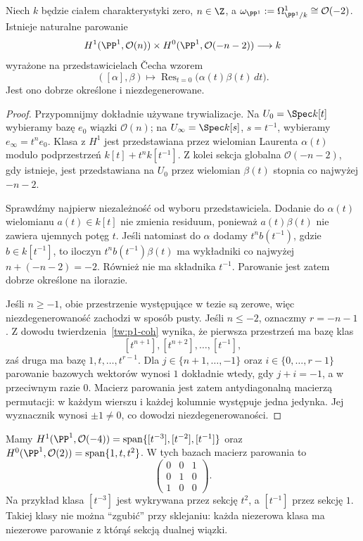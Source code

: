 \begin{twierdzenie}
\label{tw:serre-p1-explicit}
Niech $k$ będzie ciałem charakterystyki zero,
$n\in\Z$, a $\omega_{\PP^1}:=\Omega^1_{\PP^1/k}
\cong\mathcal O(-2)$. Istnieje naturalne parowanie
\[
 H^1(\PP^1,\mathcal O(n))\times
 H^0(\PP^1,\mathcal O(-n-2))\longrightarrow k
\]
wyrażone na przedstawicielach Čecha wzorem
\[
 ([\alpha],\beta)\longmapsto
 \operatorname{Res}_{t=0}\bigl(\alpha(t)\beta(t)\,dt\bigr).
\]
Jest ono dobrze określone i niezdegenerowane.
\end{twierdzenie}
\begin{proof}
Przypomnijmy dokładnie używane trywializacje.
Na $U_0=\Spec k[t]$ wybieramy bazę $e_0$ wiązki
$\mathcal O(n)$; na $U_\infty=\Spec k[s]$, $s=t^{-1}$,
wybieramy $e_\infty=t^n e_0$. Klasa z $H^1$ jest
przedstawiana przez wielomian Laurenta $\alpha(t)$ modulo
podprzestrzeń $k[t]+t^n k[t^{-1}]$.
Z kolei sekcja globalna $\mathcal O(-n-2)$,
gdy istnieje, jest przedstawiana na $U_0$ przez
wielomian $\beta(t)$ stopnia co najwyżej $-n-2$.

Sprawdźmy najpierw niezależność od wyboru przedstawiciela.
Dodanie do $\alpha(t)$ wielomianu $a(t)\in k[t]$
nie zmienia residuum, ponieważ $a(t)\beta(t)$
nie zawiera ujemnych potęg $t$. Jeśli natomiast do
$\alpha$ dodamy $t^n b(t^{-1})$, gdzie
$b\in k[t^{-1}]$, to iloczyn
$t^n b(t^{-1})\beta(t)$ ma wykładniki co najwyżej
$n+(-n-2)=-2$. Również nie ma składnika $t^{-1}$.
Parowanie jest zatem dobrze określone na ilorazie.

Jeśli $n\ge-1$, obie przestrzenie występujące
w tezie są zerowe, więc niezdegenerowaność zachodzi
w sposób pusty. Jeśli $n\le-2$, oznaczmy $r=-n-1$.
Z dowodu twierdzenia~\ref{tw:p1-coh} wynika, że
pierwsza przestrzeń ma bazę klas
\[
 [t^{n+1}],[t^{n+2}],\ldots,[t^{-1}],
\]
zaś druga ma bazę $1,t,\ldots,t^{r-1}$.
Dla $j\in\{n+1,\ldots,-1\}$ oraz
$i\in\{0,\ldots,r-1\}$ parowanie bazowych
wektorów wynosi $1$ dokładnie wtedy, gdy
$j+i=-1$, a w przeciwnym razie $0$.
Macierz parowania jest zatem antydiagonalną macierzą
permutacji: w każdym wierszu i każdej kolumnie występuje
jedna jedynka. Jej wyznacznik wynosi $\pm1\ne0$,
co dowodzi niezdegenerowaności.
\end{proof}

\begin{przyklad}[Cały rachunek dla $n=-4$]
Mamy
$H^1(\PP^1,\mathcal O(-4))
=\operatorname{span}\{[t^{-3}],[t^{-2}],[t^{-1}]\}$
oraz $H^0(\PP^1,\mathcal O(2))
=\operatorname{span}\{1,t,t^2\}$.
W tych bazach macierz parowania to
\[
 \begin{pmatrix}0&0&1\\0&1&0\\1&0&0\end{pmatrix}.
\]
Na przykład klasa $[t^{-3}]$ jest wykrywana
przez sekcję $t^2$, a $[t^{-1}]$ przez sekcję $1$.
Takiej klasy nie można ``zgubić'' przy sklejaniu:
każda niezerowa klasa ma niezerowe parowanie z którąś
sekcją dualnej wiązki.
\end{przyklad}

